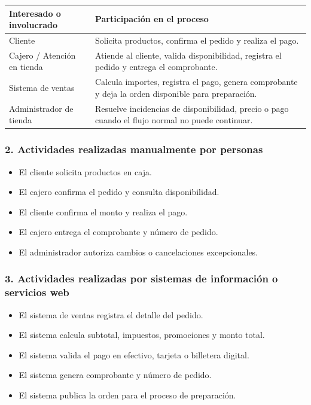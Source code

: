 \documentclass[a4paper,12pt]{article}
\begin{document}
\begin{longtable}{P{5cm} P{9cm}}
\toprule
\textbf{Interesado o involucrado} & \textbf{Participación en el proceso} \\
\midrule
Cliente & Solicita productos, confirma el pedido y realiza el pago. \\
Cajero / Atención en tienda & Atiende al cliente, valida disponibilidad, registra el pedido y entrega el comprobante. \\
Sistema de ventas & Calcula importes, registra el pago, genera comprobante y deja la orden disponible para preparación. \\
Administrador de tienda & Resuelve incidencias de disponibilidad, precio o pago cuando el flujo normal no puede continuar. \\
\bottomrule
\end{longtable}

\subsubsection*{2. Actividades realizadas manualmente por personas}

\begin{itemize}
    \item El cliente solicita productos en caja.
    \item El cajero confirma el pedido y consulta disponibilidad.
    \item El cliente confirma el monto y realiza el pago.
    \item El cajero entrega el comprobante y número de pedido.
    \item El administrador autoriza cambios o cancelaciones excepcionales.
\end{itemize}

\subsubsection*{3. Actividades realizadas por sistemas de información o servicios web}

\begin{itemize}
    \item El sistema de ventas registra el detalle del pedido.
    \item El sistema calcula subtotal, impuestos, promociones y monto total.
    \item El sistema valida el pago en efectivo, tarjeta o billetera digital.
    \item El sistema genera comprobante y número de pedido.
    \item El sistema publica la orden para el proceso de preparación.
\end{itemize}
\end{document}
